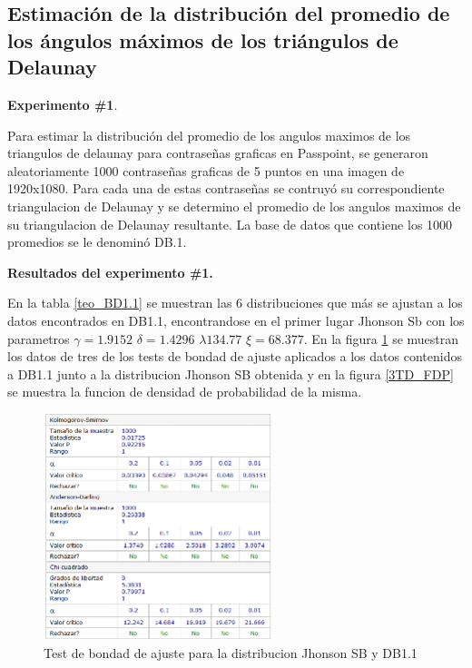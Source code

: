 \documentclass[12pt]{report}
\begin{document}
\subsection{Estimación de la distribución del promedio de los ángulos máximos de los triángulos de Delaunay }
	\textbf{Experimento \#1}.
	
	 Para estimar la distribución del promedio de los angulos maximos de los triangulos de delaunay para contraseñas graficas en Passpoint, se generaron aleatoriamente 1000 contraseñas graficas de 5 puntos en una imagen de 1920x1080. Para cada una de estas contraseñas se  contruyó  su correspondiente triangulacion  de Delaunay  y se  determino el promedio  de los angulos maximos de su triangulacion de Delaunay resultante. La base de datos que contiene los 1000 promedios se le denominó DB.1.
	 
	 \textbf{Resultados del experimento \#1.}
	 
	 En la tabla \ref{teo_BD1.1}  se muestran las 6 distribuciones que más se ajustan a los datos encontrados en DB1.1, encontrandose en el primer lugar Jhonson Sb con los parametros $\gamma=1.9152$ $\delta=1.4296$ $\lambda134.77$  $\xi=68.377$. En la figura \ref{3TD_BONDAD} se  muestran los datos de tres de los tests de bondad de ajuste aplicados a los datos contenidos a DB1.1 junto a la distribucion Jhonson SB obtenida y en la figura \ref{3TD_FDP}  se muestra la funcion de densidad de probabilidad de la misma.
	  	\begin{figure}[ht]
	  	\centering
	  	
	  	\includegraphics[width=0.6\textwidth]{3td_BONDAD.png}
	  	\caption{Test de bondad de ajuste para la distribucion Jhonson SB y DB1.1}
	  	\label{3TD_BONDAD}
	  \end{figure}
	  
\end{document}
